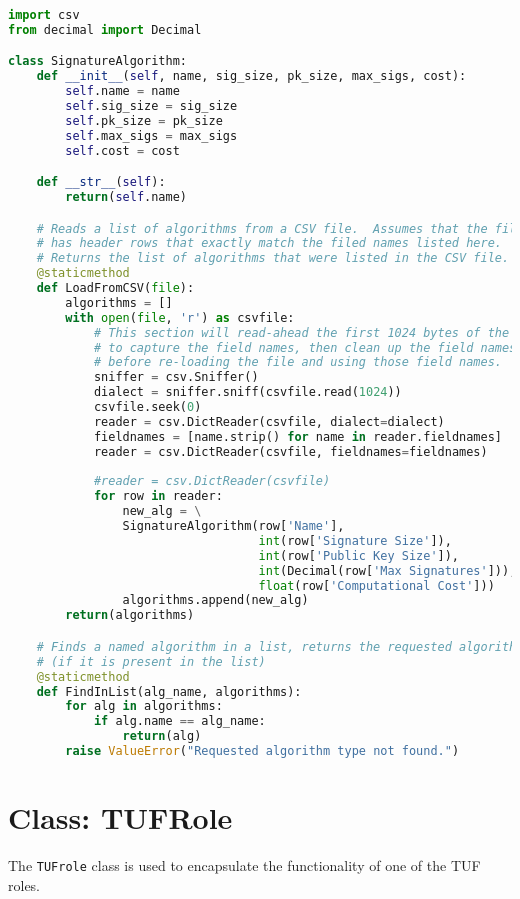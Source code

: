 \documentclass{article}
\begin{document}
\begin{lstlisting}[language=Python, basicstyle=\tiny]
import csv
from decimal import Decimal

class SignatureAlgorithm:
    def __init__(self, name, sig_size, pk_size, max_sigs, cost):
        self.name = name
        self.sig_size = sig_size
        self.pk_size = pk_size
        self.max_sigs = max_sigs
        self.cost = cost

    def __str__(self):
        return(self.name)

    # Reads a list of algorithms from a CSV file.  Assumes that the file
    # has header rows that exactly match the filed names listed here.
    # Returns the list of algorithms that were listed in the CSV file.
    @staticmethod
    def LoadFromCSV(file):
        algorithms = []
        with open(file, 'r') as csvfile:
            # This section will read-ahead the first 1024 bytes of the CSV
            # to capture the field names, then clean up the field names
            # before re-loading the file and using those field names.
            sniffer = csv.Sniffer()
            dialect = sniffer.sniff(csvfile.read(1024))
            csvfile.seek(0)
            reader = csv.DictReader(csvfile, dialect=dialect)
            fieldnames = [name.strip() for name in reader.fieldnames]
            reader = csv.DictReader(csvfile, fieldnames=fieldnames)
            
            #reader = csv.DictReader(csvfile)
            for row in reader:
                new_alg = \
                SignatureAlgorithm(row['Name'],
                                   int(row['Signature Size']),
                                   int(row['Public Key Size']),
                                   int(Decimal(row['Max Signatures'])),
                                   float(row['Computational Cost']))
                algorithms.append(new_alg)
        return(algorithms)

    # Finds a named algorithm in a list, returns the requested algorithm
    # (if it is present in the list)
    @staticmethod
    def FindInList(alg_name, algorithms):
        for alg in algorithms:
            if alg.name == alg_name:
                return(alg)
        raise ValueError("Requested algorithm type not found.")
\end{lstlisting}

\section{Class: TUFRole}
The \texttt{TUFrole} class is used to encapsulate the functionality of one of the TUF roles.  
\end{document}
